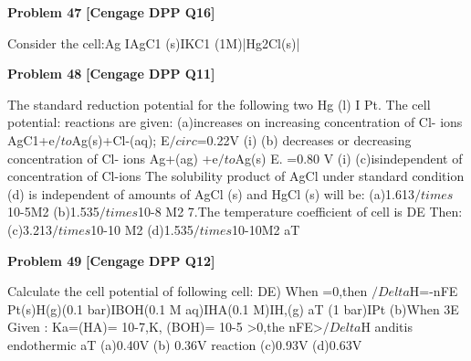 \begin{problembox}
\textbf{Problem 47} \hfill \textbf{[Cengage DPP Q16]}
\label{q:ext-cng_dpp_all_questions-47}

Consider the cell:Ag IAgC1 (s)IKC1 (1M)|Hg2Cl(s)|
\end{problembox}

\begin{problembox}
\textbf{Problem 48} \hfill \textbf{[Cengage DPP Q11]}
\label{q:ext-cng_dpp_all_questions-48}

The standard reduction potential for the following two
Hg (l) I Pt. The cell potential:
reactions are given:
(a)increases on increasing concentration of Cl- ions
AgC1+e$/to$Ag(s)+Cl-(aq);
E$/circ$=0.22V
(i)
(b) decreases or decreasing concentration of Cl- ions
Ag+(ag) +e$/to$Ag(s)
E. =0.80 V
(i)
(c)isindependent of concentration of Cl-ions
The solubility product of AgCl under standard condition
(d) is independent of amounts of AgCl (s) and HgCl (s)
will be:
(a)1.613$/times$10-5M2
(b)1.535$/times$10-8 M2
7.The temperature coefficient of cell is
DE
Then:
(c)3.213$/times$10-10 M2
(d)1.535$/times$10-10M2
aT
\end{problembox}

\begin{problembox}
\textbf{Problem 49} \hfill \textbf{[Cengage DPP Q12]}
\label{q:ext-cng_dpp_all_questions-49}

Calculate the cell potential of following cell:
DE)
When
=0,then $/Delta$H=-nFE
Pt(s)H(g)(0.1 bar)IBOH(0.1 M aq)IHA(0.1 M)IH,(g)
aT
(1 bar)IPt
(b)When
3E
Given : Ka=(HA)= 10-7,K, (BOH)= 10-5
>0,the nFE>$/Delta$H anditis endothermic
aT
(a)0.40V
(b) 0.36V
reaction
(c)0.93V
(d)0.63V
\end{problembox}

